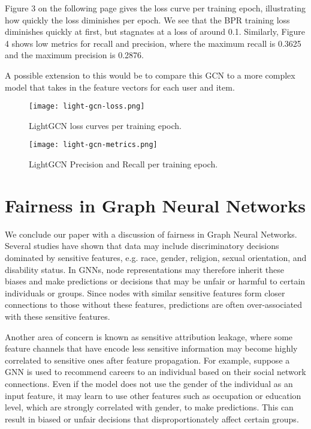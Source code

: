 \documentclass[final]{article}
\begin{document}
Figure 3 on the following page gives the loss curve per training epoch, illustrating how quickly the loss diminishes per epoch. We see that the BPR training loss diminishes quickly at first, but stagnates at a loss of around 0.1. Similarly, Figure 4 shows low metrics for recall and precision, where the maximum recall is 0.3625 and the maximum precision is 0.2876. 

A possible extension to this would be to compare this GCN to a more complex model that takes in the feature vectors for each user and item. 
\begin{figure}[!hbt]
  \centering
 \texttt{[image: light-gcn-loss.png]}
  \caption{LightGCN loss curves per training epoch.}
 \end{figure}
\clearpage
 \begin{figure}[!hbt]
  \centering
 \texttt{[image: light-gcn-metrics.png]}
  \caption{LightGCN Precision and Recall per training epoch.}
 \end{figure}


\section{Fairness in Graph Neural Networks}

We conclude our paper with a discussion of fairness in Graph Neural Networks. Several studies have shown that  data may include discriminatory decisions dominated by sensitive features, e.g. race, gender, religion, sexual orientation, and disability status. In GNNs, node representations may therefore inherit these biases and make predictions or decisions that may be unfair or harmful to certain individuals or groups. Since nodes with similar sensitive features form closer connections to those without these features, predictions are often over-associated with these sensitive features. 

Another area of concern is known as sensitive attribution leakage, where some feature channels that have encode less sensitive information may become highly correlated to sensitive ones after feature propagation. For example, suppose a GNN is used to recommend careers to an individual based on their social network connections. Even if the model does not use the gender of the individual as an input feature, it may learn to use other features such as occupation or education level, which are strongly correlated with gender, to make predictions. This can result in biased or unfair decisions that disproportionately affect certain groups.
\end{document}
